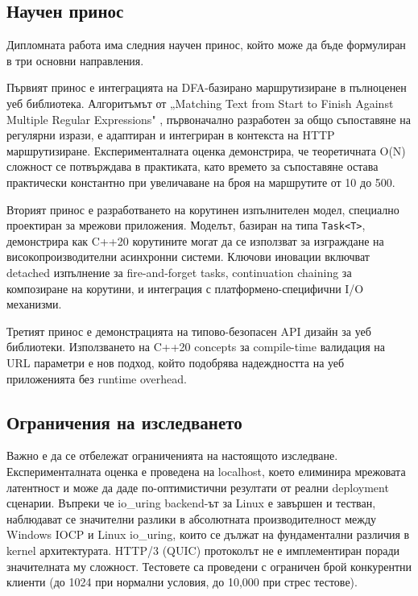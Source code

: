 \subsection{Научен принос}

Дипломната работа има следния научен принос, който може да бъде формулиран в три основни направления.

Първият принос е интеграцията на DFA-базирано маршрутизиране в пълноценен уеб библиотека. Алгоритъмът от „Matching Text from Start to Finish Against Multiple Regular Expressions" \cite{stankov2024regex}, първоначално разработен за общо съпоставяне на регулярни изрази, е адаптиран и интегриран в контекста на HTTP маршрутизиране. Експерименталната оценка демонстрира, че теоретичната O(N) сложност се потвърждава в практиката, като времето за съпоставяне остава практически константно при увеличаване на броя на маршрутите от 10 до 500.

Вторият принос е разработването на корутинен изпълнителен модел, специално проектиран за мрежови приложения. Моделът, базиран на типа \texttt{Task<T>}, демонстрира как C++20 корутините могат да се използват за изграждане на високопроизводителни асинхронни системи. Ключови иновации включват detached изпълнение за fire-and-forget tasks, continuation chaining за композиране на корутини, и интеграция с платформено-специфични I/O механизми.

Третият принос е демонстрацията на типово-безопасен API дизайн за уеб библиотеки. Използването на C++20 concepts за compile-time валидация на URL параметри е нов подход, който подобрява надеждността на уеб приложенията без runtime overhead.

\subsection{Ограничения на изследването}

Важно е да се отбележат ограниченията на настоящото изследване. Експерименталната оценка е проведена на localhost, което елиминира мрежовата латентност и може да даде по-оптимистични резултати от реални deployment сценарии. Въпреки че io\_uring backend-ът за Linux е завършен и тестван, наблюдават се значителни разлики в абсолютната производителност между Windows IOCP и Linux io\_uring, които се дължат на фундаментални различия в kernel архитектурата. HTTP/3 (QUIC) протоколът не е имплементиран поради значителната му сложност. Тестовете са проведени с ограничен брой конкурентни клиенти (до 1024 при нормални условия, до 10,000 при стрес тестове).

